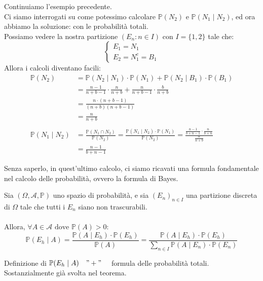 \begin{esempio}
    Continuiamo l'esempio precedente.\\
    Ci siamo interrogati su come potessimo calcolare $\mathbb{P}(N_2)$ e $\mathbb{P}(N_1\mid N_2)$, ed ora abbiamo la soluzione: con le probabilità totali.\\
    Possiamo vedere la nostra partizione $(E_n:n\in I)\text{ con }I=\{1, 2\}$ tale che:
    \[
    \begin{cases}
        E_1=N_1\\
        E_2=N_1^c=B_1
    \end{cases}
    \]
    Allora i calcoli diventano facili:
    \begin{align*}
        \mathbb{P}(N_2) &= \mathbb{P}(N_2\mid N_1)\cdot\mathbb{P}(N_1) + \mathbb{P}(N_2\mid B_1)\cdot\mathbb{P}(B_1)\\
        &=\frac{n-1}{n+b-1}\cdot \frac{n}{n+b} + \frac{n}{n+b-1}\cdot\frac{b}{n+b}\\
        &=\frac{n\cdot(n+b-1)}{(n+b)(n+b-1)}\\
        &= \frac{n}{n+b}\\
        \\
        \mathbb{P}(N_1\mid N_2) &=\frac{\mathbb{P}(N_1\cap N_2)}{\mathbb{P}(N_2)} = \frac{\mathbb{P}(N_1\mid N_2)\cdot \mathbb{P}(N_1)}{\mathbb{P}(N_2)} = \frac{\frac{n-1}{b+n-1}\cdot \frac{n}{b+n}}{\frac{n}{n+b}}\\
        &=\frac{n-1}{b+n-1}
    \end{align*}
\end{esempio}
\bigskip
\noindent Senza saperlo, in quest'ultimo calcolo, ci siamo ricavati una formula fondamentale nel calcolo delle probabilità, ovvero la formula di Bayes.
\begin{teorema}
    Sia $(\Omega, \mathcal{A}, \mathbb{P})$ uno spazio di probabilità, e sia $(E_n)_{n\in I}$ una partizione discreta di $\Omega$ tale che tutti i $E_n$ siano non trascurabili.\\
    \\
    Allora, $\forall A\in \mathcal{A} \text{ dove } \mathbb{P}(A)>0:$
    \[\boxed{
    \mathbb{P}(E_h\mid A) = \frac{\mathbb{P}(A\mid E_h)\cdot \mathbb{P}(E_h)}{\mathbb{P}(A)} = \frac{\mathbb{P}(A\mid E_h)\cdot \mathbb{P}(E_h)}{\sum_{n\in I}\mathbb{P}(A\mid E_n)\cdot \mathbb{P}(E_n)}
    }
    \]
    \begin{dimostrazione}
        Definizione di $\mathbb{P}(E_h\mid A)\quad"+"\quad$ formula delle probabilità totali. Sostanzialmente già svolta nel teorema.
    \end{dimostrazione}
\end{teorema}

